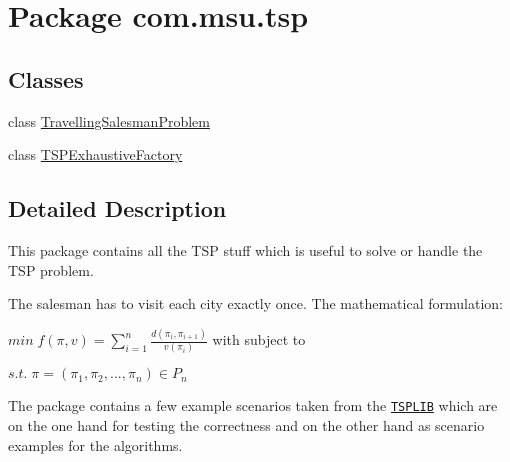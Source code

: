 \hypertarget{namespacecom_1_1msu_1_1tsp}{\section{Package com.\-msu.\-tsp}
\label{namespacecom_1_1msu_1_1tsp}
}
\subsection*{Classes}
\begin{DoxyCompactItemize}
\item 
class \hyperlink{classcom_1_1msu_1_1tsp_1_1TravellingSalesmanProblem}{Travelling\-Salesman\-Problem}
\item 
class \hyperlink{classcom_1_1msu_1_1tsp_1_1TSPExhaustiveFactory}{T\-S\-P\-Exhaustive\-Factory}
\end{DoxyCompactItemize}


\subsection{Detailed Description}
This package contains all the T\-S\-P stuff which is useful to solve or handle the T\-S\-P problem.

The salesman has to visit each city exactly once. The mathematical formulation\-:

$min \; f(\pi,v) = \sum_{i=1}^{n} \frac{ d(\pi_i, \pi_{i+1})}{v(\pi_i)}$ with subject to

$s.t. \; \pi = (\pi_1, \pi_2, ..., \pi_n) \in P_n $

The package contains a few example scenarios taken from the \href{http://comopt.ifi.uni-heidelberg.de/software/TSPLIB95/}{\tt T\-S\-P\-L\-I\-B} which are on the one hand for testing the correctness and on the other hand as scenario examples for the algorithms. 